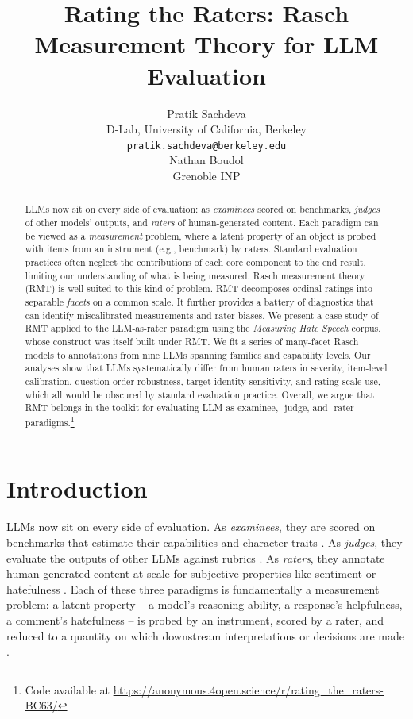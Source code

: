 \documentclass[11pt]{article}
\title{Rating the Raters: Rasch Measurement Theory for LLM Evaluation}
\author{Pratik Sachdeva \\
  D-Lab, University of California, Berkeley \\
  \texttt{pratik.sachdeva@berkeley.edu} \\\And
  Nathan Boudol \\
  Grenoble INP \\}
\begin{document}
\maketitle
\begin{abstract}
LLMs now sit on every side of evaluation: as \textit{examinees} scored on benchmarks, \textit{judges} of other models' outputs, and \textit{raters} of human-generated content. Each paradigm can be viewed as a \textit{measurement} problem, where a latent property of an object is probed with items from an instrument (e.g., benchmark) by raters. Standard evaluation practices often neglect the contributions of each core component to the end result, limiting our understanding of what is being measured. Rasch measurement theory (RMT) is well-suited to this kind of problem. RMT decomposes ordinal ratings into separable \textit{facets} on a common scale. It further provides a battery of diagnostics that can identify miscalibrated measurements and rater biases. We present a case study of RMT applied to the LLM-as-rater paradigm using the \textit{Measuring Hate Speech} corpus, whose construct was itself built under RMT. We fit a series of many-facet Rasch models to annotations from nine LLMs spanning families and capability levels. Our analyses show that LLMs systematically differ from human raters in severity, item-level calibration, question-order robustness, target-identity sensitivity, and rating scale use, which all would be obscured by standard evaluation practice. Overall, we argue that RMT belongs in the toolkit for evaluating LLM-as-examinee, -judge, and -rater paradigms.\footnote{Code available at \url{https://anonymous.4open.science/r/rating_the_raters-BC63/}}
\end{abstract}

\section{Introduction}
LLMs now sit on every side of evaluation. As \textit{examinees}, they are scored on benchmarks that estimate their capabilities and character traits \cite{hendrycks2021measuring, srivastava2023beyond}. As \textit{judges}, they evaluate the outputs of other LLMs against rubrics \cite{zheng2023judging, li2024llms}. As \textit{raters}, they annotate human-generated content at scale for subjective properties like sentiment or hatefulness \cite{gilardi2023chatgpt, calderon2025alternative}. Each of these three paradigms is fundamentally a measurement problem: a latent property -- a model's reasoning ability, a response's helpfulness, a comment's hatefulness -- is probed by an instrument, scored by a rater, and reduced to a quantity on which downstream interpretations or decisions are made \cite{Wallach2025GenAIMeasurement, Weidinger2025EvaluationScience, Zhou2026GeneralScales}.
\end{document}
